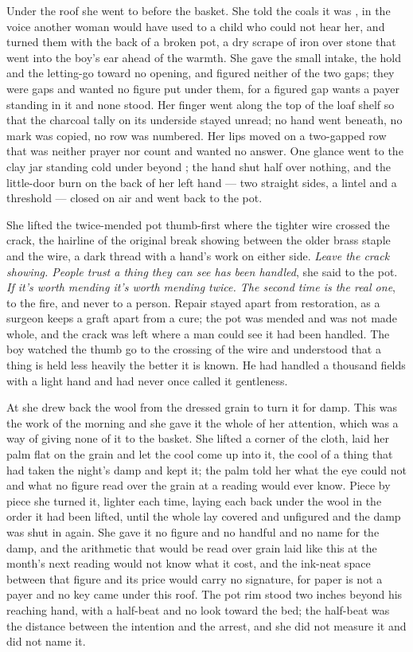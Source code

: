 Under the roof she went to  before the basket. She told the coals it was , in the voice another woman would have used to a child who could not hear her, and turned them with the back of a broken pot, a dry scrape of iron over stone that went into the boy's ear ahead of the warmth. She gave the small intake, the hold and the letting-go toward no opening, and figured neither of the two gaps; they were gaps and wanted no figure put under them, for a figured gap wants a payer standing in it and none stood. Her finger went along the top of the loaf shelf so that the charcoal tally on its underside stayed unread; no hand went beneath, no mark was copied, no row was numbered. Her lips moved on a two-gapped row that was neither prayer nor count and wanted no answer. One glance went to the clay jar standing cold under  beyond ; the hand shut half over nothing, and the little-door burn on the back of her left hand --- two straight sides, a lintel and a threshold --- closed on air and went back to the pot.

She lifted the twice-mended pot thumb-first where the tighter wire crossed the crack, the hairline of the original break showing between the older brass staple and the wire, a dark thread with a hand's work on either side. \emph{Leave the crack showing. People trust a thing they can see has been handled}, she said to the pot. \emph{If it's worth mending it's worth mending twice. The second time is the real one}, to the fire, and never to a person. Repair stayed apart from restoration, as a surgeon keeps a graft apart from a cure; the pot was mended and was not made whole, and the crack was left where a man could see it had been handled. The boy watched the thumb go to the crossing of the wire and understood that a thing is held less heavily the better it is known. He had handled a thousand fields with a light hand and had never once called it gentleness.

At  she drew back the wool from the dressed grain to turn it for damp. This was the work of the morning and she gave it the whole of her attention, which was a way of giving none of it to the basket. She lifted a corner of the cloth, laid her palm flat on the grain and let the cool come up into it, the cool of a thing that had taken the night's damp and kept it; the palm told her what the eye could not and what no figure read over the grain at a reading would ever know. Piece by piece she turned it, lighter each time, laying each back under the wool in the order it had been lifted, until the whole lay covered and unfigured and the damp was shut in again. She gave it no figure and no handful and no name for the damp, and the arithmetic that would be read over grain laid like this at the month's next reading would not know what it cost, and the ink-neat space between that figure and its price would carry no signature, for paper is not a payer and no key came under this roof. The pot rim stood two inches beyond his reaching hand, with a half-beat and no look toward the bed; the half-beat was the distance between the intention and the arrest, and she did not measure it and did not name it.

